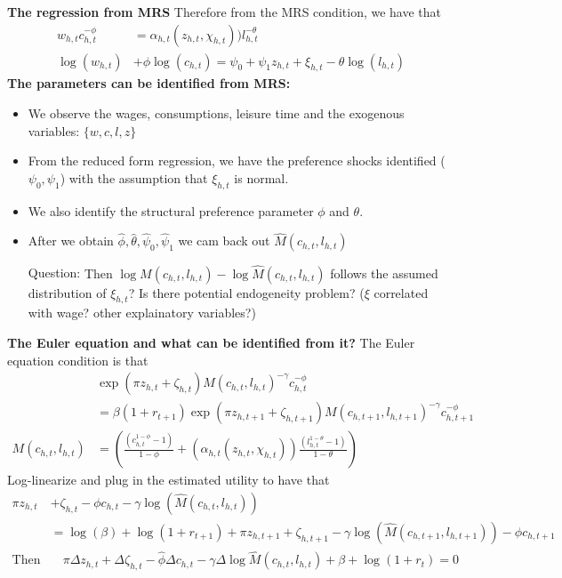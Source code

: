 \textbf{The regression from MRS}
Therefore from the MRS condition, we have that
\[\begin{split}
   w_{h,t}c_{h,t}^{-\phi} &= \alpha_{h,t}(z_{h,t},\chi_{h,t})) l_{h,t}^{-\theta}  \\
   \log(w_{h,t})& + \phi \log(c_{h,t})  = \psi_0 + \psi_1 z_{h,t} + \xi_{h,t} - \theta \log(l_{h,t})
\end{split} \]
\textbf{The parameters can be identified from MRS:}
\begin{itemize}
  \item We observe the wages, consumptions, leisure time and the exogenous variables: $\{w,c,l,z\}$
  \item From the reduced form regression, we have the preference shocks identified ($\psi_0,\psi_1$) with the assumption that $\xi_{h,t}$ is normal.
  \item We also identify the structural preference parameter $\phi$ and $\theta$.
  \item After we obtain $\hat{\phi},\hat{\theta},\hat{\psi}_0,\hat{\psi}_1$ we cam back out $\hat{M}(c_{h,t},l_{h,t})$
  \item[Question:] {\color{red} Then $\log M(c_{h,t}, l_{h,t}) - \log \hat{M}(c_{h,t},l_{h,t})$ follows the assumed distribution of $\xi_{h,t}$? Is there potential endogeneity problem? ($\xi$ correlated with wage? other explainatory variables?)}
\end{itemize}
\textbf{The Euler equation and what can be identified from it?}
The Euler equation condition is that
\[ \begin{split}
  & \exp{( \pi z_{h,t} + \zeta_{h,t} )} M(c_{h,t},l_{h,t})^{-\gamma} c_{h,t}^{-\phi} \\
  & = \beta (1+r_{t+1}) \exp{( \pi z_{h,t+1} + \zeta_{h,t+1} )} M(c_{h,t+1},l_{h,t+1})^{-\gamma} c_{h,t+1}^{-\phi} \\
  M(c_{h,t},l_{h,t}) & = \left( \frac{(c_{h,t}^{1 - \phi} - 1)}{1 - \phi} + (\alpha_{h,t}(z_{h,t},\chi_{h,t})) \frac{(l_{h,t}^{1 - \theta} -1)}{ 1 - \theta}\right)
\end{split} \]
Log-linearize and plug in the estimated utility to have that
\[ \begin{split}
  \pi z_{h,t} & + \zeta_{h,t} - \phi c_{h,t} - \gamma \log(\hat{M}(c_{h,t},l_{h,t})) \\ & = \log(\beta) + \log(1+r_{t+1}) + \pi z_{h,t+1} + \zeta_{h,t+1} - \gamma \log(\hat{M}(c_{h,t+1},l_{h,t+1})) - \phi c_{h,t+1} \\
  \text{Then we have}& \quad  \pi \Delta z_{h,t} + \Delta \zeta_{h,t} - \hat{\phi} \Delta c_{h,t} - \gamma \Delta \log \hat{M}(c_{h,t},l_{h,t}) + \beta + \log(1+r_t)= 0
\end{split} \]
